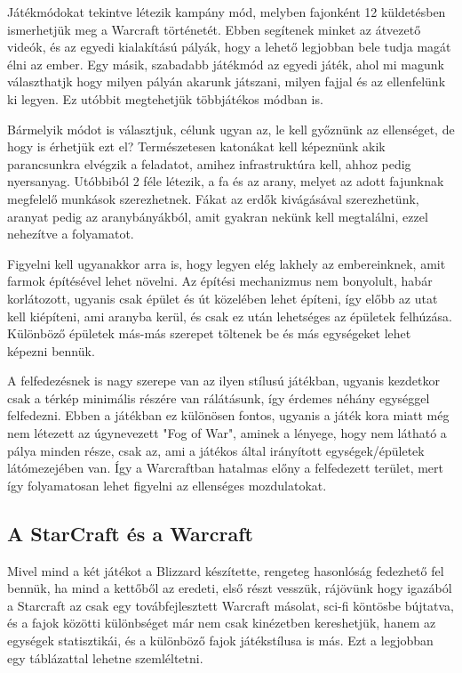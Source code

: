 Játékmódokat tekintve létezik kampány mód, melyben fajonként 12 küldetésben ismerhetjük meg a Warcraft történetét. Ebben segítenek minket az átvezető videók, és az egyedi kialakítású pályák, hogy a lehető legjobban bele tudja magát élni az ember.
Egy másik, szabadabb játékmód az egyedi játék, ahol mi magunk választhatjk hogy milyen pályán akarunk játszani, milyen fajjal és az ellenfelünk ki legyen. Ez utóbbit megtehetjük többjátékos módban is.

Bármelyik módot is választjuk, célunk ugyan az, le kell győznünk az ellenséget, de hogy is érhetjük ezt el? Természetesen katonákat kell képeznünk akik parancsunkra elvégzik a feladatot, amihez infrastruktúra kell, ahhoz pedig nyersanyag. Utóbbiból 2 féle létezik, a fa és az arany, melyet az adott fajunknak megfelelő munkások szerezhetnek. Fákat az erdők kivágásával szerezhetünk, aranyat pedig az aranybányákból, amit gyakran nekünk kell megtalálni, ezzel nehezítve a folyamatot. 

Figyelni kell ugyanakkor arra is, hogy legyen elég lakhely az embereinknek, amit farmok építésével lehet növelni. Az építési mechanizmus nem bonyolult, habár korlátozott, ugyanis csak épület és út közelében lehet építeni, így előbb az utat kell kiépíteni, ami aranyba kerül, és csak ez után lehetséges az épületek felhúzása. Különböző épületek más-más szerepet töltenek be és más egységeket lehet képezni bennük. 

A felfedezésnek is nagy szerepe van az ilyen stílusú játékban, ugyanis kezdetkor csak a térkép minimális részére van rálátásunk, így érdemes néhány egységgel felfedezni. Ebben a játékban ez különösen fontos, ugyanis a játék kora miatt még nem létezett az úgynevezett "Fog of War", aminek a lényege, hogy nem látható a pálya minden része, csak az, ami a játékos által irányított egységek/épületek látómezejében van. Így a Warcraftban hatalmas előny a felfedezett terület, mert így folyamatosan lehet figyelni az ellenséges mozdulatokat.

\subsection{A StarCraft és a Warcraft}
Mivel mind a két játékot a Blizzard készítette, rengeteg hasonlóság fedezhető fel bennük, ha mind a kettőből az eredeti, első részt vesszük, rájövünk hogy igazából a Starcraft az csak egy továbfejlesztett Warcraft másolat, sci-fi köntösbe bújtatva, és a fajok közötti különbséget már nem csak kinézetben kereshetjük, hanem az egységek statisztikái, és a különböző fajok játékstílusa is más. Ezt a legjobban egy táblázattal lehetne szemléltetni.

